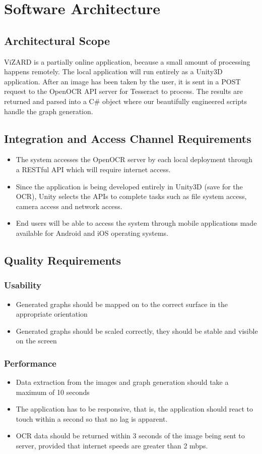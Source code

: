 \documentclass[a4paper,12pt]{article}
\begin{document}
\newpage
\section{Software Architecture}
\subsection{Architectural Scope}
ViZARD is a partially online application, because a small amount of processing happens remotely. The local application will run entirely as a Unity3D application. After an image has been taken by the user, it is sent in a POST request to the OpenOCR API server for Tesseract to process. The results are returned and parsed into a C\# object where our beautifully engineered scripts handle the graph generation.

\subsection{Integration and Access Channel Requirements}
\begin{itemize}
\item The system accesses the OpenOCR server by each local deployment through a RESTful API which will require internet access.
\item  Since the application is being developed entirely in Unity3D (save for the OCR), Unity selects the APIs to complete tasks such as file system access, camera access and network access.
\item End users will be able to access the system through mobile applications made available for Android and iOS operating systems.
\end{itemize}

\subsection{Quality Requirements}
\subsubsection*{Usability}
\begin{itemize}		
	\item Generated graphs should be mapped on to the correct surface in the appropriate orientation
	\item Generated graphs should be scaled correctly, they should be stable and visible on the screen
\end{itemize}
\subsubsection*{Performance}	
\begin{itemize}		
	\item Data extraction from the images and graph generation should take a maximum of 10 seconds
	\item The application has to be responsive, that is, the application should react to touch within a second so that no lag is apparent.
	\item OCR data should be returned within 3 seconds of the image being sent to server, provided that internet speeds are greater than 2 mbps.	
\end{itemize}
\end{document}

